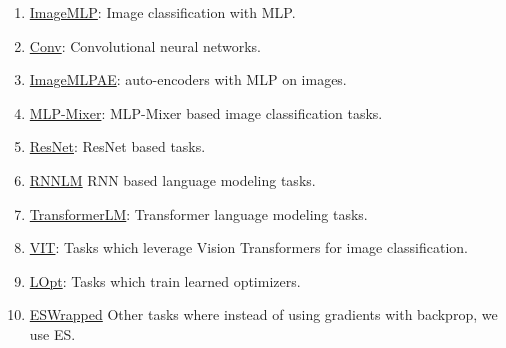 \documentclass[11pt]{article}
\begin{document}
\begin{enumerate}
    \item \href{https://github.com/google/learned_optimization/blob/84dcc4aedca079e5ace851a2839d60663821e2ea/learned_optimization/tasks/fixed/image_mlp.py}{ImageMLP}: Image classification with MLP.
    \item \href{https://github.com/google/learned_optimization/blob/b1d8267c5e513a4112e7422b98bacc16e1f0e844/learned_optimization/tasks/fixed/conv.py}{Conv}: Convolutional neural networks.
    \item \href{https://github.com/google/learned_optimization/blob/b1d8267c5e513a4112e7422b98bacc16e1f0e844/learned_optimization/tasks/fixed/image_mlp_ae.py}{ImageMLPAE}: auto-encoders with MLP on images.
    \item \href{https://github.com/google/learned_optimization/blob/b1d8267c5e513a4112e7422b98bacc16e1f0e844/learned_optimization/tasks/fixed/mlp_mixer.py}{MLP-Mixer}: MLP-Mixer based image classification tasks.
    \item \href{https://github.com/google/learned_optimization/blob/b1d8267c5e513a4112e7422b98bacc16e1f0e844/learned_optimization/tasks/fixed/resnet.py}{ResNet}: ResNet based tasks.
    \item \href{https://github.com/google/learned_optimization/blob/b1d8267c5e513a4112e7422b98bacc16e1f0e844/learned_optimization/tasks/fixed/rnn_lm.py}{RNNLM} RNN based language modeling tasks.
    \item \href{https://github.com/google/learned_optimization/blob/b1d8267c5e513a4112e7422b98bacc16e1f0e844/learned_optimization/tasks/fixed/transformer_lm.py}{TransformerLM}: Transformer language modeling tasks.
    \item \href{https://github.com/google/learned_optimization/blob/b1d8267c5e513a4112e7422b98bacc16e1f0e844/learned_optimization/tasks/fixed/vit.py}{VIT}: Tasks which leverage Vision Transformers for image classification.
    \item \href{https://github.com/google/learned_optimization/blob/b1d8267c5e513a4112e7422b98bacc16e1f0e844/learned_optimization/tasks/fixed/lopt.py}{LOpt}: Tasks which train learned optimizers.
    \item \href{https://github.com/google/learned_optimization/blob/b1d8267c5e513a4112e7422b98bacc16e1f0e844/learned_optimization/tasks/fixed/es_wrapped.py}{ESWrapped} Other tasks where instead of using gradients with backprop, we use ES.
\end{enumerate}
\end{document}
